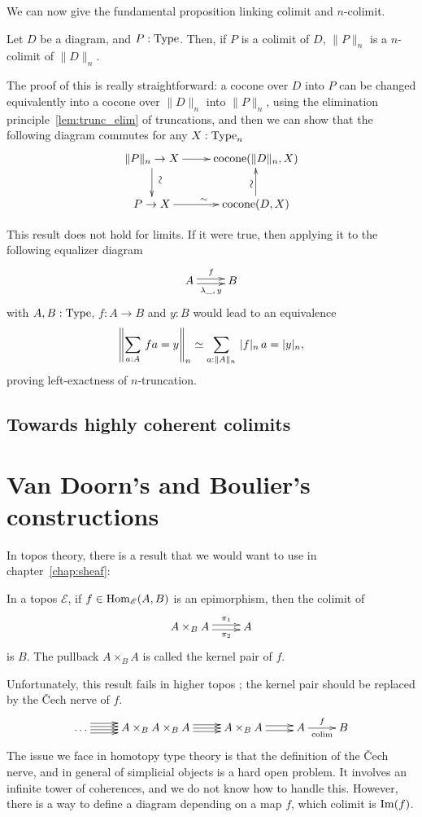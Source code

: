 We can now give the fundamental proposition linking colimit and
$n$-colimit.

\begin{prop}
  Let $D$ be a diagram, and $P:\operatorname{Type}$.
  Then, if $P$ is a colimit of $D$, $\|P\|_n$ is a $n$-colimit of $\|D\|_n$.
\end{prop}

The proof of this is really straightforward: a cocone over $D$ into
$P$ can be changed equivalently into a cocone over $\|D\|_n$ into $\|P\|_n$, using the
elimination principle~\ref{lem:trunc_elim} of truncations, and then
we can show that the following diagram commutes for any $X:\operatorname{Type}_n$
\[
  \xymatrix{
    \|P\|_n \to X \ar[r] \ar[d]^*[@]{\hbox to 0pt{\hss$\sim$\hss}} & \mathrm{cocone}(\|D\|_n,X) \\
    P \to X \ar[r]^\sim& \mathrm{cocone}(D,X) \ar[u]^*[@]{\hbox to 0pt{\hss$\sim$\hss}}
  }
\]

\begin{rmq}
This result does not hold for limits. If it were
true, then applying it to the following equalizer diagram
\[ \xymatrix{ A \ar@<-.5ex>[r]_{\lambda \_,\,y} \ar@<.5ex>[r]^f & B }\]
with $A,B:\operatorname{Type}$, $f:A\to B$ and $y:B$ would lead to an equivalence
\[ \left\| \sum_{a:A}\, f a = y \right\|_{n} \simeq \sum_{a:\|A\|_{n}}\, |f|_{n}\, a = |y|_{n}, \]
proving left-exactness of $n$-truncation.  
\end{rmq}

\subsection{Towards highly coherent colimits}
\label{ssec:high_colimit}

\section{Van Doorn's and Boulier's constructions}
\label{sec:floris}

In topos theory, there is a result that we would want to use in
chapter~\ref{chap:sheaf}:
\begin{lem}
  In a topos $\mathcal E$, if $f\in\mathrm{Hom}_{\mathcal E}(A,B)$ is an epimorphism, then the colimit
  of
  \[ \xymatrix{ A\times_B A \ar@<-.5ex>[r]_-{\pi_2}
      \ar@<.5ex>[r]^-{\pi_1} & A }\]
  is $B$. The pullback $A\times_B A$ is called the kernel pair of $f$.
  
\end{lem}
Unfortunately, this result fails in higher topos ; the kernel pair
should be replaced by the \v{C}ech nerve of $f$.
\[
  \xymatrix{
    \dots \ar@<-1ex>[r]\ar@<-.33ex>[r]\ar@<.33ex>[r]\ar@<1ex>[r] & A\times_B A\times_B A \ar@<-.7ex>[r] \ar[r] \ar@<.7ex>[r]
    & A\times_B A \ar@<-.5ex>[r] \ar@<.5ex>[r] & A \ar[r]^f_{\colim}& B
  }
\]
The issue we face in homotopy type theory is that the definition of
the \v{C}ech nerve, and in general of simplicial objects is a hard
open problem. It involves an infinite tower of coherences, and we
do not know how to handle this. However, there is a way to define a
diagram depending on a map $f$, which colimit is $\operatorname{Im}(f)$.

